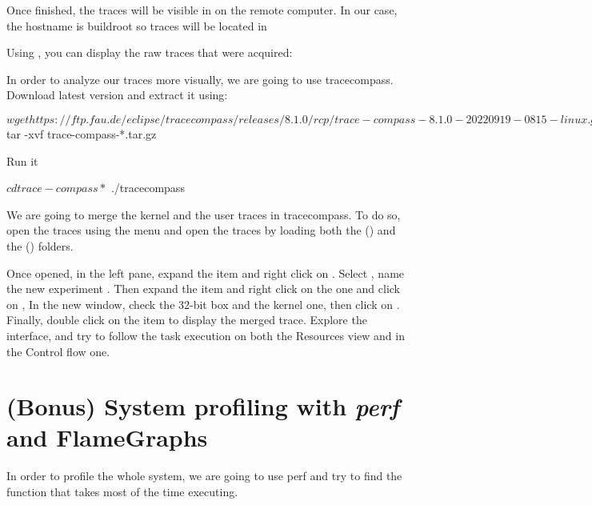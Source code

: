 Once finished, the traces will be visible in 
on the remote computer. In our case, the hostname is buildroot so traces will be
located in 

Using , you can display the raw traces that were acquired:

In order to analyze our traces more visually, we are going to use tracecompass.
Download  latest version and extract it using:

\begin{bashinput}
$ wget https://ftp.fau.de/eclipse/tracecompass/releases/8.1.0/rcp/trace-compass-8.1.0-20220919-0815-linux.gtk.x86_64.tar.gz
$ tar -xvf trace-compass-*.tar.gz
\end{bashinput}

Run it
\begin{bashinput}
$ cd trace-compass*
$ ./tracecompass
\end{bashinput}

We are going to merge the kernel and the user traces in tracecompass. To do so,
open the traces using the  menu and open the traces
by loading both the  () and the 
() folders.

Once opened, in the left pane, expand the  item and right click
on . Select , name the new experiment
. Then expand the  item and right click on
the  one and click on , In the new
window, check the 32-bit box and the kernel one, then click on .
Finally, double click on the  item to display the merged
trace. Explore the interface, and try to follow the task execution on both the
Resources view and in the Control flow one.

\section{(Bonus) System profiling with {\em perf} and FlameGraphs}

In order to profile the whole system, we are going to use perf and try to find
the function that takes most of the time executing.

